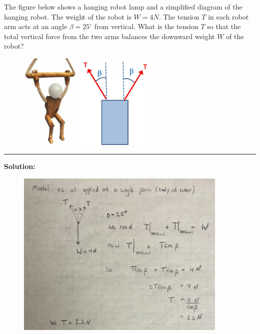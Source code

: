 
The figure below shows a hanging robot lamp and a simplified diagram of the hanging robot. The weight of the robot is $W = 4N$. The tension $T$ in each robot arm acts at an angle $\beta = 25^\circ$ from vertical. What is the tension $T$ so that the total vertical force from the two arms balances the downward weight $W$ of the robot?

\begin{figure}[ht!]
  \centering
  \includegraphics[height=1.8in]{robot-lamp.png}
  \includegraphics[height=1.8in]{robot-lamp-diagram.png}
\end{figure}

\vspace{.5cm}
\rule{\textwidth}{.4pt}
\vspace{.5cm}
\textbf{Solution:}
\begin{figure}[ht!]
  \centering
  \includegraphics[width=0.9\textwidth]{soln.png}
\end{figure}


